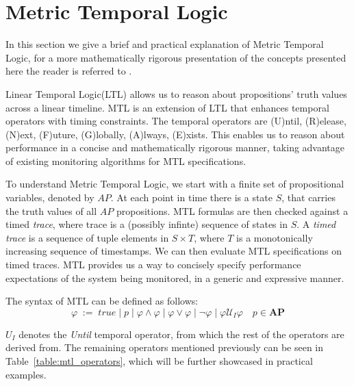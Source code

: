 \documentclass[twocolumn]{article}
\begin{document}
\section{Metric Temporal Logic}
In this section we give a brief and practical explanation of Metric Temporal Logic, for a more mathematically rigorous presentation of the concepts presented here the reader is referred to \cite{hendriks_checking_2016,dhananjayan_metric_2014,thati_monitoring_2005,pnueli_temporal_1977}.
\par
Linear Temporal Logic(LTL) \cite{pnueli_temporal_1977} allows us to reason about propositions' truth values across a linear timeline.
MTL \cite{koymans_specifying_1990} is an extension of LTL that enhances temporal operators with timing constraints. The temporal operators are (U)ntil, (R)elease, (N)ext, (F)uture, (G)lobally, (A)lways, (E)xists.
This enables us to reason about performance in a concise and mathematically rigorous manner, taking advantage of existing
monitoring algorithms for MTL specifications.

\par
To understand Metric Temporal Logic, we start with a finite set of propositional variables, denoted by $AP$.
At each point in time there is a state $S$, that carries the truth values of all $AP$ propositions.
MTL formulas are then checked against a timed \emph{trace}, where trace is a (possibly infinte) sequence of states in $S$.
A \emph{timed trace} is a sequence of tuple elements in $S \times T$, where $T$ is a monotonically increasing sequence of timestamps.
We can then evaluate MTL specifications on timed traces.
MTL provides us a way to concisely specify performance expectations of the system being monitored, in a generic and expressive manner.

\par
The syntax of MTL can be defined as follows:
\[
	\varphi \; := \; true \; | \; p \; | \; \varphi \land \varphi \; | \; \varphi \lor \varphi \;| \; \neg \varphi \; | \; \varphi \mathcal{U}_I \varphi \quad p \in \mathbf{AP}
\]

$U_I$ denotes the \emph{Until} temporal operator, from which the rest of the operators are derived from.
The remaining operators mentioned previously can be seen in Table~\ref{table:mtl_operators}, which will
be further showcased in practical examples.
\end{document}
